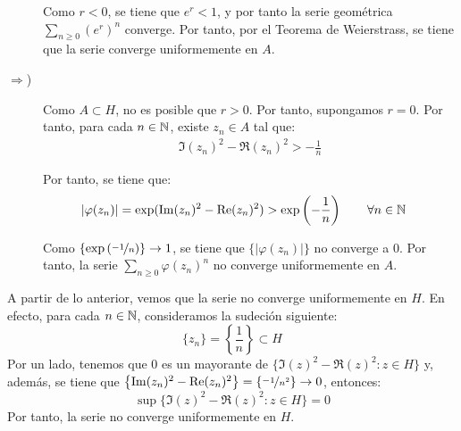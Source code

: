 \begin{ejercicio}
\begin{description}
        Como $r<0$, se tiene que $e^r<1$, y por tanto la serie geométrica $\sum\limits_{n\geq 0} \left(e^r\right)^n$ converge. Por tanto, por el Teorema de Weierstrass, se tiene que la serie converge uniformemente en $A$.

        \item[$\Longrightarrow$)] Como $A\subset H$, no es posible que $r>0$. Por tanto, supongamos $r=0$. Por tanto, para cada $n\in \bb{N}$, existe $z_n\in A$ tal que:
        \begin{align*}
            \Im(z_n)^2 - \Re(z_n)^2 > -\frac{1}{n}
        \end{align*}

        Por tanto, se tiene que:
        \begin{align*}
            |\varphi(z_n)| &= \exp(\Im(z_n)^2 - \Re(z_n)^2) > \exp\left(-\frac{1}{n}\right)\qquad \forall n\in \bb{N}
        \end{align*}

        Como $\left\{\exp\left(\nicefrac{-1}{n}\right)\right\}\to 1$, se tiene que $\{|\varphi(z_n)|\}$ no converge a $0$. Por tanto, la serie $\sum\limits_{n\geq 0} \varphi(z_n)^n$ no converge uniformemente en $A$.
    \end{description}

    A partir de lo anterior, vemos que la serie no converge uniformemente en $H$. En efecto, para cada $n\in \bb{N}$, consideramos la sudeción siguiente:
    \begin{equation*}
        \{z_n\} = \left\{\dfrac{1}{n}\right\} \subset H
    \end{equation*}
    Por un lado, tenemos que $0$ es un mayorante de $\{\Im(z)^2 - \Re(z)^2 : z\in H\}$ y, además, se tiene que  $\left\{\Im(z_n)^2 - \Re(z_n)^2\right\} = \left\{\nicefrac{-1}{n^2}\right\} \to 0$, entonces:
    \begin{equation*}
        \sup\{\Im(z)^2 - \Re(z)^2 : z\in H\} = 0
    \end{equation*}
    Por tanto, la serie no converge uniformemente en $H$.
\end{ejercicio}

